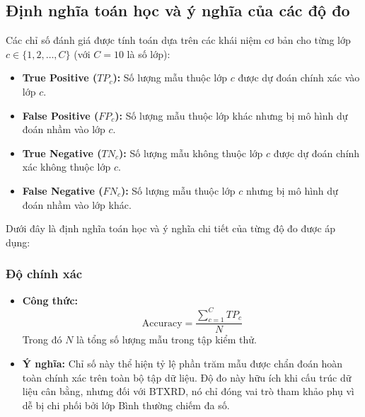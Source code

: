 \subsection{Định nghĩa toán học và ý nghĩa của các độ đo}
Các chỉ số đánh giá được tính toán dựa trên các khái niệm cơ bản cho từng lớp $c \in \{1, 2, \dots, C\}$ (với $C = 10$ là số lớp):
\begin{itemize}
    \item \textbf{True Positive ($TP_c$):} Số lượng mẫu thuộc lớp $c$ được dự đoán chính xác vào lớp $c$.
    \item \textbf{False Positive ($FP_c$):} Số lượng mẫu thuộc lớp khác nhưng bị mô hình dự đoán nhầm vào lớp $c$.
    \item \textbf{True Negative ($TN_c$):} Số lượng mẫu không thuộc lớp $c$ được dự đoán chính xác không thuộc lớp $c$.
    \item \textbf{False Negative ($FN_c$):} Số lượng mẫu thuộc lớp $c$ nhưng bị mô hình dự đoán nhầm vào lớp khác.
\end{itemize}

Dưới đây là định nghĩa toán học và ý nghĩa chi tiết của từng độ đo được áp dụng:

\subsubsection{Độ chính xác}
\begin{itemize}
    \item \textbf{Công thức:}
    \begin{equation}
        \text{Accuracy} = \frac{\sum_{c=1}^{C} TP_c}{N}
    \end{equation}
    Trong đó $N$ là tổng số lượng mẫu trong tập kiểm thử.
    \item \textbf{Ý nghĩa:} Chỉ số này thể hiện tỷ lệ phần trăm mẫu được chẩn đoán hoàn toàn chính xác trên toàn bộ tập dữ liệu. Độ đo này hữu ích khi cấu trúc dữ liệu cân bằng, nhưng đối với BTXRD, nó chỉ đóng vai trò tham khảo phụ vì dễ bị chi phối bởi lớp Bình thường chiếm đa số.
\end{itemize}

